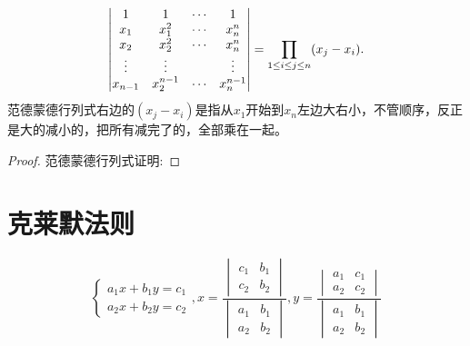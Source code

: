 \documentclass[lang=cn,10pt]{elegantbook}
\begin{document}
\begin{theorem}[范德蒙德行列式] \label{thm:fdmdhls} 
\begin{equation}
   \label{eq:fdmdhls}
   \begin{vmatrix}
       1&1&\cdots&1\\
       x_1&x_1^2&\cdots&x_n^n\\
       x_2&x_2^2&\cdots&x_n^n\\
       \vdots&\vdots& &\vdots\\
        x_{n-1}&x_2^{n-1}&\cdots&x_n^{n-1}\\
   \end{vmatrix}=\prod\limits_{1\le i \le j \le n} (x_j-x_i).\\
\end{equation}
范德蒙德行列式右边的$(x_j-x_i)$是指从$x_1$开始到$x_n$左边大右小，不管顺序，反正是大的减小的，把所有减完了的，全部乘在一起。
\end{theorem}

\begin{proof}
范德蒙德行列式证明:
\end{proof}

\section{克莱默法则}
\begin{theorem}[二阶克莱默法则] \label{thm:ejklmfz} 
\begin{equation}
   \label{eq:ejklmfz}
   \left \{
   \begin{aligned}
       a_1x+b_1y =c_1\\
       a_2x+b_2y =c_2
   \end{aligned}
   \right.,
   x = \frac{\begin{vmatrix}
       c_1&b_1\\c_2&b_2
   \end{vmatrix}}{\begin{vmatrix}
       a_1&b_1\\a_2&b_2
   \end{vmatrix}},
   y = \frac{\begin{vmatrix}
       a_1&c_1\\a_2&c_2
   \end{vmatrix}}{\begin{vmatrix}
       a_1&b_1\\a_2&b_2
   \end{vmatrix}}
\end{equation}
\end{theorem}
\end{document}
